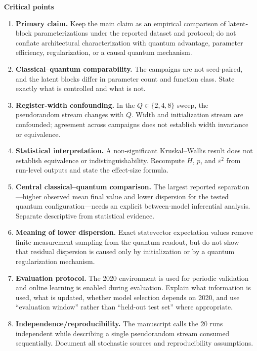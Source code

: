 \documentclass[aps,floatfix,superscriptaddress,twocolumn,tightenlines,amsmath,amssymb,nofootinbib,10pt,longbibliography,prl]{revtex4-2}
\begin{document}
\begin{tcolorbox}[enhanced,breakable,title={\textbf{SB REVIEW --- Critical points to discuss before manuscript revision}},colback=magenta!3,colframe=magenta!70!black,boxrule=0.8pt,arc=1mm,left=2mm,right=2mm,top=1.5mm,bottom=1.5mm,before skip=6pt,after skip=6pt]
\small
\textbf{Critical points}
\begin{enumerate}
\item \textbf{Primary claim.} Keep the main claim as an empirical comparison of latent-block parameterizations under the reported dataset and protocol; do not conflate architectural characterization with quantum advantage, parameter efficiency, regularization, or a causal quantum mechanism.
\item \textbf{Classical--quantum comparability.} The campaigns are not seed-paired, and the latent blocks differ in parameter count and function class. State exactly what is controlled and what is not.
\item \textbf{Register-width confounding.} In the $Q\in\{2,4,8\}$ sweep, the pseudorandom stream changes with $Q$. Width and initialization stream are confounded; agreement across campaigns does not establish width invariance or equivalence.
\item \textbf{Statistical interpretation.} A non-significant Kruskal--Wallis result does not establish equivalence or indistinguishability. Recompute $H$, $p$, and $\varepsilon^2$ from run-level outputs and state the effect-size formula.
\item \textbf{Central classical--quantum comparison.} The largest reported separation---higher observed mean final value and lower dispersion for the tested quantum configuration---needs an explicit between-model inferential analysis. Separate descriptive from statistical evidence.
\item \textbf{Meaning of lower dispersion.} Exact statevector expectation values remove finite-measurement sampling from the quantum readout, but do not show that residual dispersion is caused only by initialization or by a quantum regularization mechanism.
\item \textbf{Evaluation protocol.} The 2020 environment is used for periodic validation and online learning is enabled during evaluation. Explain what information is used, what is updated, whether model selection depends on 2020, and use ``evaluation window'' rather than ``held-out test set'' where appropriate.
\item \textbf{Independence/reproducibility.} The manuscript calls the 20 runs independent while describing a single pseudorandom stream consumed sequentially. Document all stochastic sources and reproducibility assumptions.

\end{enumerate}
\end{tcolorbox}
\end{document}
